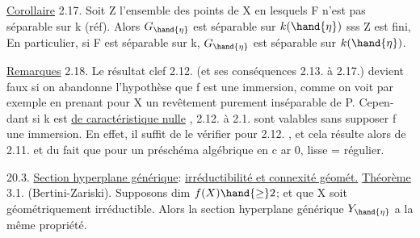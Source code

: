 
\uline{Corollaire} 2.17.   Soit Z l'ensemble des points de X en lesquels F
n'est pas séparable sur k (réf). Alors  $G_{\hand{\eta}}$ est séparable sur $k(\hand{\eta})$ sss
Z est fini, En particulier, si F est séparable sur k, $G_{\hand{\eta}}$ est séparable
sur $k(\hand{\eta})$.

\uline{Remarques} 2.18.  Le résultat clef  2.12. (et ses conséquences 2.13. à 2.17.) devient faux si on abandonne
l'hypothèse que f est une immersion, comme  on voit par exemple en
prenant pour  X un revêtement purement inséparable de P.   Cepen-%
dant 
  si  k est \uline{de caractéristique nulle} ,  2.12. à
2.1. sont valables sans supposer f une immersion.  En effet, il suffit
de le vérifier pour 2.12. , et  cela résulte alors de 2.11. et du fait
que  pour un préschéma algébrique en c ar 0,  lisse = régulier.



20.3.   \uline{Section hyperplane générique}: \uline{irréductibilité et connexité géomét.}
\uline{Théorème} 3.1. (Bertini-Zariski).  Supposons dim $f(X) \hand{\geq} 2$; et que X
soit  géométriquement irréductible. Alors
la section hyperplane générique $Y_{\hand{\eta}}$ a la même propriété.




